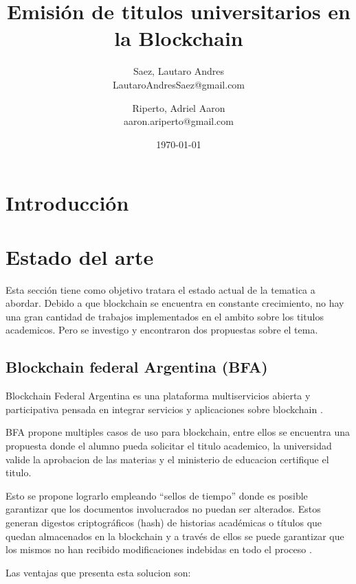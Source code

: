 \documentclass[11pt,a4paper]{article}
\title{ 
    Emisión de titulos universitarios
    en la Blockchain
}
\author{
    Saez, Lautaro Andres \\ \small{ LautaroAndresSaez@gmail.com } 
    \and 
    Riperto, Adriel Aaron \\ \small{ aaron.ariperto@gmail.com } 
}
\date{\today}
\begin{document}
    \maketitle

    \section{Introducción}

    \section{Estado del arte}

        Esta sección tiene como objetivo tratara el estado actual de la tematica a abordar.
        Debido a que blockchain se encuentra en constante crecimiento, no hay una gran cantidad 
        de trabajos implementados en el ambito sobre los titulos academicos. Pero se investigo 
        y encontraron dos propuestas sobre el tema. %

        \subsection{Blockchain federal Argentina (BFA)}


        Blockchain Federal Argentina es una plataforma multiservicios abierta y participativa pensada en integrar servicios y aplicaciones
        sobre blockchain \cite{Blockchain-federal-Argentina}. %
        
        BFA propone multiples casos de uso para blockchain, entre ellos se encuentra una propuesta donde el alumno pueda solicitar
        el titulo academico, la universidad valide la aprobacion de las materias y el ministerio de educacion certifique el titulo.

        Esto se propone lograrlo empleando “sellos de tiempo” donde es posible garantizar que los documentos involucrados 
        no puedan ser alterados. Estos generan digestos criptográficos (hash) de historias académicas o títulos que quedan 
        almacenados en la blockchain y a través de ellos se puede garantizar que los mismos no han recibido modificaciones 
        indebidas en todo el proceso \cite{titulos-academicos}. %
 
        Las ventajas que presenta esta solucion son:
        
\end{document}
